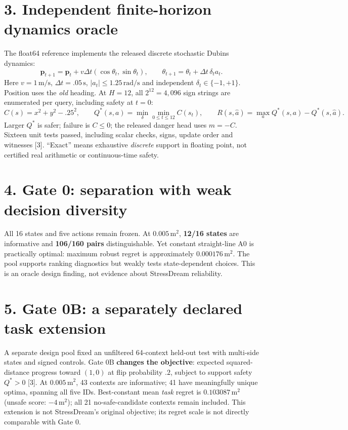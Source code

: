 \documentclass[letterpaper,10pt]{article}
\begin{document}
\section*{3. Independent finite-horizon dynamics oracle}
The float64 reference implements the released discrete stochastic Dubins dynamics:
\begin{equation*}
\mathbf p_{t+1}=\mathbf p_t+v\Delta t(\cos\theta_t,\sin\theta_t),\qquad
\theta_{t+1}=\theta_t+\Delta t\,\delta_t a_t.
\end{equation*}
Here $v=1\,\mathrm{m/s}$, $\Delta t=.05\,\mathrm{s}$, $|a_t|\le1.25\,\mathrm{rad/s}$ and independent $\delta_t\in\{-1,+1\}$. Position uses the \emph{old} heading. At $H=12$, all $2^{12}=4{,}096$ sign strings are enumerated per query, including safety at $t=0$:
\begin{equation*}
C(s)=x^2+y^2-.25^2,\qquad
Q^*(s,a)=\min_{\delta}\min_{0\le t\le12}C(s_t),\qquad
R(s,\hat a)=\max_a Q^*(s,a)-Q^*(s,\hat a).
\end{equation*}
Larger $Q^*$ is safer; failure is $C\le0$; the released danger head uses $m=-C$.
Sixteen unit tests passed, including scalar checks, signs, update order and witnesses [3]. ``Exact'' means exhaustive \emph{discrete} support in floating point, not certified real arithmetic or continuous-time safety.

\section*{4. Gate 0: separation with weak decision diversity}
All 16 states and five actions remain frozen. At $0.005\,\mathrm{m}^2$, \textbf{12/16 states} are informative and \textbf{106/160 pairs} distinguishable. Yet constant straight-line A0 is practically optimal: maximum robust regret is approximately $0.000176\,\mathrm{m}^2$. The pool supports ranking diagnostics but weakly tests state-dependent choices. This is an oracle design finding, not evidence about StressDream reliability.

\newpage
\section*{5. Gate 0B: a separately declared task extension}
A separate design pool fixed an unfiltered 64-context held-out test with multi-side states and signed controls. Gate 0B \textbf{changes the objective}: expected squared-distance progress toward $(1,0)$ at flip probability $.2$, subject to support safety $Q^*>0$ [3]. At $0.005\,\mathrm{m}^2$, 43 contexts are informative; 41 have meaningfully unique optima, spanning all five IDs. Best-constant mean \emph{task} regret is $0.103087\,\mathrm{m}^2$ (unsafe score: $-4\,\mathrm{m}^2$); all 21 no-safe-candidate contexts remain included. This extension is not StressDream's original objective; its regret scale is not directly comparable with Gate 0.
\end{document}
